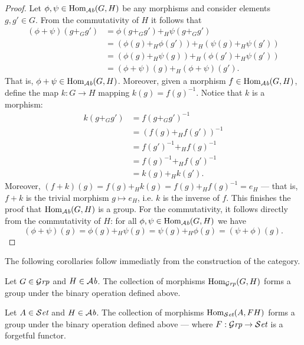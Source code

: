 \begin{proof}
  Let \(\phi, \psi \in \operatorname{Hom}_{\mathcal{A}\textit{b}}(G, H)\) be any morphisms and consider elements
  \(g, g' \in G\). From the commutativity of \(H\) it follows that
  \begin{align*}
    (\phi + \psi)(g +_G g')
    &= \phi(g +_G g') +_H \psi(g +_G g')
    \\
    &= \left(\phi(g) +_H \phi(g')\right) +_H \left(\psi(g) +_H \psi(g')\right)
    \\
    &= \left(\phi(g) +_H \psi(g)\right) +_H \left(\phi(g') +_H \psi(g')\right)
    \\
    &= (\phi + \psi)(g) +_H (\phi + \psi)(g').
  \end{align*}
  That is, \(\phi + \psi \in \operatorname{Hom}_{\mathcal{A}\textit{b}}(G, H)\). Moreover, given a morphism \(f
  \in \operatorname{Hom}_{\mathcal{A}\textit{b}}(G, H)\), define the map \(k: G \to H\) mapping \(k(g) =
  f(g)^{-1}\). Notice that \(k\) is a morphism:
  \begin{align*}
    k(g +_G g')
    &= f(g +_G g')^{-1} \\
    &= (f(g) +_H f(g'))^{-1} \\
    &= f(g')^{-1} +_H f(g)^{-1} \\
    &= f(g)^{-1} +_H f(g')^{-1} \\
    &= k(g) +_H k(g').
  \end{align*}
  Moreover, \((f + k)(g) = f(g) +_H k(g) = f(g) +_H f(g)^{-1} = e_H\) --- that
  is, \(f + k\) is the trivial morphism \(g \mapsto e_H\), i.e. \(k\) is the
  inverse of \(f\). This finishes the proof that \(\operatorname{Hom}_{\mathcal{A}\textit{b}}(G, H)\) is a group.
  For the commutativity, it follows directly from the commutativity of \(H\):
  for all \(\phi, \psi \in \operatorname{Hom}_{\mathcal{A}\textit{b}}(G, H)\) we have
  \[
    (\phi + \psi)(g) = \phi(g) +_H \psi(g) = \psi(g) +_H \phi(g) = (\psi +
    \phi)(g).
  \]
\end{proof}

The following corollaries follow immediatly from the construction of the
category.

\begin{corollary}
  Let \(G \in {\mathcal{G}\textit{rp}}\) and \(H \in {\mathcal{A}\textit{b}}\). The collection of morphisms
  \(\operatorname{Hom}_{\mathcal{G}\textit{rp}}(G, H)\) forms a group under the binary operation defined above.
\end{corollary}

\begin{corollary}
  Let \(A \in {\mathcal{S}\textit{et}}\) and \(H \in {\mathcal{A}\textit{b}}\). The collection of morphisms
  \(\operatorname{Hom}_{\mathcal{S}\textit{et}}(A, FH)\) forms a group under the binary operation defined above
  --- where \(F: {\mathcal{G}\textit{rp}} \to {\mathcal{S}\textit{et}}\) is a forgetful functor.
\end{corollary}

